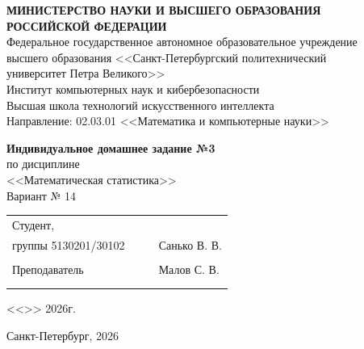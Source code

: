 \documentclass[12pt,a4paper]{article}
\begin{document}
	
	\thispagestyle{empty}
	\begin{titlepage}
		\begin{center}
			\textbf{МИНИСТЕРСТВО НАУКИ И ВЫСШЕГО ОБРАЗОВАНИЯ\\
				РОССИЙСКОЙ ФЕДЕРАЦИИ}\\[6pt]
			Федеральное государственное автономное образовательное учреждение\\
			высшего образования <<Санкт-Петербургский политехнический\\
			университет Петра Великого>>\\[6pt]
			Институт компьютерных наук и кибербезопасности\\
			Высшая школа технологий искусственного интеллекта\\[6pt]
			Направление: 02.03.01 <<Математика и компьютерные науки>>
			
			\vfill
			
			{\large\textbf{Индивидуальное домашнее задание №3}}\\[6pt]
			по дисциплине\\[4pt]
			{\large <<Математическая статистика>>}\\[12pt]
			{\large Вариант №{} 14}
			
			\vfill
			
			\small{
				\begin{tabular}{lrrl}
					\!\!\!Студент, & \hspace{2cm} & & \\
					\!\!\!группы 5130201/30102 & \hspace{2cm} & \underline{\hspace{3cm}} & Санько В. В. \\\\
					\!\!\!Преподаватель & \hspace{2cm} & \underline{\hspace{3cm}} & Малов С. В. \\\\
					&&\hspace{4cm}
				\end{tabular}
				\begin{flushright}
					<<\underline{\hspace{1cm}}>>\underline{\hspace{2.5cm}} 2026г.
				\end{flushright}
			}
			
			\hfill \break
			\begin{center} \small{Санкт-Петербург, 2026} \end{center}
		\end{center}
	\end{titlepage}
	
\end{document}
